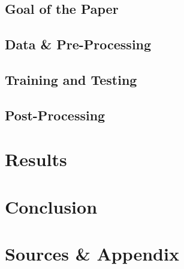 \documentclass[
12pt,
headsepline,
bibliography=totoc,
twoside=semi,
fleqn
]{scrartcl}
\begin{document}
  \subsection{Goal of the Paper\label{sec:sec3-1}}
  \subsection{Data \& Pre-Processing\label{sec:sec3-2}}
  \subsection{Training and Testing\label{sec:sec3-3}}
  \subsection{Post-Processing\label{sec:sec3-4}}

\section{Results\label{sec:sec4}}

\section{Conclusion\label{sec:sec5}}

\section{Sources \& Appendix\label{sec.sec5}}

\end{document}
